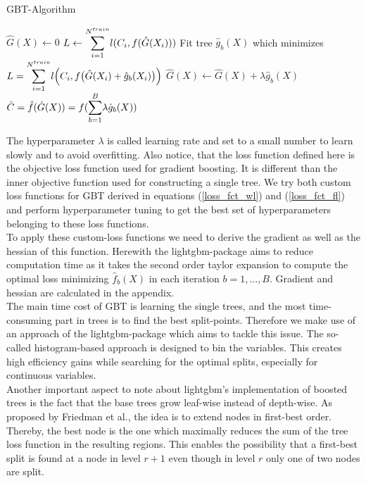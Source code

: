 \documentclass[12pt,titlepage]{article}
\begin{document}
\begin{algorithm}
\caption{GBT-Algorithm}\label{alg:boostedtrees}
\begin{algorithmic}
    \State $\hat{G}(X) \gets 0$
    \State $L \gets \mathlarger{\sum}_{i=1}^{N^{train}} l(C_{i}, f(\hat{G}(X_{i})))$
        \State Fit tree $\hat{g}_{b}(X)$ which minimizes $L = \mathlarger{\sum}_{i=1}^{N^{train}} l\Big(C_{i}, f\big(\hat{G}(X_{i}) + \hat{g}_{b}(X_{i})\big)\Big)$
        \State $\hat{G}(X) \gets \hat{G}(X) + \lambda\hat{g}_{b}(X)$
    \EndFor
    \State $\hat{C} = \hat{f}(\hat{G}(X)) = f(\mathlarger{\sum}_{b=1}^{B}\lambda\hat{g}_{b}(X))$
\end{algorithmic}
\end{algorithm}
\vspace{3mm}
\noindent
The hyperparameter $\lambda$ is called learning rate and set to a small number to learn slowly and to avoid overfitting. Also notice, that the loss function defined here is the objective loss function used for gradient boosting. It is different than the inner objective function used for constructing a single tree. We try both custom loss functions for GBT derived in equations (\ref{loss_fct_wl}) and (\ref{loss_fct_fl}) and perform hyperparameter tuning to get the best set of hyperparameters belonging to these loss functions. \\
To apply these custom-loss functions we need to derive the gradient as well as the hessian of this function. Herewith the lightgbm-package \cite{gbt} aims to reduce computation time as it takes the second order taylor expansion to compute the optimal loss minimizing $\hat{f}_{b}(X)$ in each iteration $b=1,...,B$. Gradient and hessian are calculated in the appendix. \\
The main time cost of GBT is learning the single trees, and the most time-consuming part in trees is to find the best split-points. Therefore we make use of an approach of the lightgbm-package which aims to tackle this issue. The so-called histogram-based approach is designed to bin the variables. This creates high efficiency gains while searching for the optimal splits, especially for continuous variables. \\
Another important aspect to note about lightgbm's implementation of boosted trees is the fact that the base trees grow leaf-wise instead of depth-wise. As proposed by Friedman et al., the idea is to extend nodes in first-best order. Thereby, the best node is the one which maximally reduces the sum of the tree loss function in the resulting regions. This enables the possibility that a first-best split is found at a node in level $r+1$ even though in level $r$ only one of two nodes are split. \\
\end{document}
